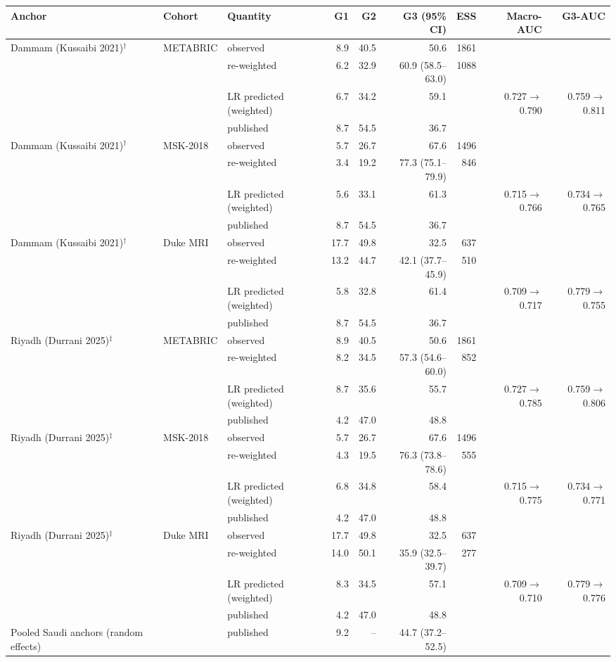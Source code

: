 \begin{tabular}{lllrrrrrr}
\toprule
Anchor & Cohort & Quantity & G1 & G2 & G3 (95\% CI) & ESS & Macro-AUC & G3-AUC \\
\midrule
Dammam (Kussaibi 2021)$^\dagger$ & METABRIC & observed & 8.9 & 40.5 & 50.6 & 1861 & & \\
 & & re-weighted & 6.2 & 32.9 & 60.9 (58.5--63.0) & 1088 & & \\
 & & LR predicted (weighted) & 6.7 & 34.2 & 59.1 & & 0.727$\to$0.790 & 0.759$\to$0.811 \\
 & & published & 8.7 & 54.5 & 36.7 & & & \\
\addlinespace
Dammam (Kussaibi 2021)$^\dagger$ & MSK-2018 & observed & 5.7 & 26.7 & 67.6 & 1496 & & \\
 & & re-weighted & 3.4 & 19.2 & 77.3 (75.1--79.9) & 846 & & \\
 & & LR predicted (weighted) & 5.6 & 33.1 & 61.3 & & 0.715$\to$0.766 & 0.734$\to$0.765 \\
 & & published & 8.7 & 54.5 & 36.7 & & & \\
\addlinespace
Dammam (Kussaibi 2021)$^\dagger$ & Duke MRI & observed & 17.7 & 49.8 & 32.5 & 637 & & \\
 & & re-weighted & 13.2 & 44.7 & 42.1 (37.7--45.9) & 510 & & \\
 & & LR predicted (weighted) & 5.8 & 32.8 & 61.4 & & 0.709$\to$0.717 & 0.779$\to$0.755 \\
 & & published & 8.7 & 54.5 & 36.7 & & & \\
\addlinespace
Riyadh (Durrani 2025)$^\ddagger$ & METABRIC & observed & 8.9 & 40.5 & 50.6 & 1861 & & \\
 & & re-weighted & 8.2 & 34.5 & 57.3 (54.6--60.0) & 852 & & \\
 & & LR predicted (weighted) & 8.7 & 35.6 & 55.7 & & 0.727$\to$0.785 & 0.759$\to$0.806 \\
 & & published & 4.2 & 47.0 & 48.8 & & & \\
\addlinespace
Riyadh (Durrani 2025)$^\ddagger$ & MSK-2018 & observed & 5.7 & 26.7 & 67.6 & 1496 & & \\
 & & re-weighted & 4.3 & 19.5 & 76.3 (73.8--78.6) & 555 & & \\
 & & LR predicted (weighted) & 6.8 & 34.8 & 58.4 & & 0.715$\to$0.775 & 0.734$\to$0.771 \\
 & & published & 4.2 & 47.0 & 48.8 & & & \\
\addlinespace
Riyadh (Durrani 2025)$^\ddagger$ & Duke MRI & observed & 17.7 & 49.8 & 32.5 & 637 & & \\
 & & re-weighted & 14.0 & 50.1 & 35.9 (32.5--39.7) & 277 & & \\
 & & LR predicted (weighted) & 8.3 & 34.5 & 57.1 & & 0.709$\to$0.710 & 0.779$\to$0.776 \\
 & & published & 4.2 & 47.0 & 48.8 & & & \\
\addlinespace
Pooled Saudi anchors (random effects) & & published & 9.2 & -- & 44.7 (37.2--52.5) & & & \\
\bottomrule
\end{tabular}